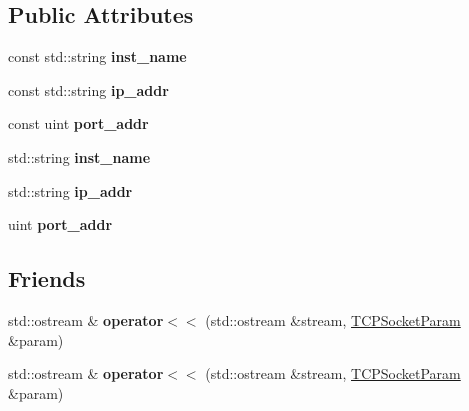 \subsection*{Public Attributes}
\begin{DoxyCompactItemize}
\item 
const std\+::string {\bfseries inst\+\_\+name}\hypertarget{struct_t_c_p_socket_param_adbcd0c094d7e3a8f8b083689ddccaff0}{}\label{struct_t_c_p_socket_param_adbcd0c094d7e3a8f8b083689ddccaff0}

\item 
const std\+::string {\bfseries ip\+\_\+addr}\hypertarget{struct_t_c_p_socket_param_a4dc4a074c147c36e0b281f7c25a96185}{}\label{struct_t_c_p_socket_param_a4dc4a074c147c36e0b281f7c25a96185}

\item 
const uint {\bfseries port\+\_\+addr}\hypertarget{struct_t_c_p_socket_param_a25103ad0fba22c679759538a8e2061b9}{}\label{struct_t_c_p_socket_param_a25103ad0fba22c679759538a8e2061b9}

\item 
std\+::string {\bfseries inst\+\_\+name}\hypertarget{struct_t_c_p_socket_param_ac6dd6cff76fe32d52214c39c8541201e}{}\label{struct_t_c_p_socket_param_ac6dd6cff76fe32d52214c39c8541201e}

\item 
std\+::string {\bfseries ip\+\_\+addr}\hypertarget{struct_t_c_p_socket_param_a4f424a058098e28b8a51c5d17b1fdc8a}{}\label{struct_t_c_p_socket_param_a4f424a058098e28b8a51c5d17b1fdc8a}

\item 
uint {\bfseries port\+\_\+addr}\hypertarget{struct_t_c_p_socket_param_a32da96a5f7f1aa3fe92db4454fba947c}{}\label{struct_t_c_p_socket_param_a32da96a5f7f1aa3fe92db4454fba947c}

\end{DoxyCompactItemize}
\subsection*{Friends}
\begin{DoxyCompactItemize}
\item 
std\+::ostream \& {\bfseries operator$<$$<$} (std\+::ostream \&stream, \hyperlink{struct_t_c_p_socket_param}{T\+C\+P\+Socket\+Param} \&param)\hypertarget{struct_t_c_p_socket_param_a2d9b78bcfdce6bdc7e301d7e819114c7}{}\label{struct_t_c_p_socket_param_a2d9b78bcfdce6bdc7e301d7e819114c7}

\item 
std\+::ostream \& {\bfseries operator$<$$<$} (std\+::ostream \&stream, \hyperlink{struct_t_c_p_socket_param}{T\+C\+P\+Socket\+Param} \&param)\hypertarget{struct_t_c_p_socket_param_a2d9b78bcfdce6bdc7e301d7e819114c7}{}\label{struct_t_c_p_socket_param_a2d9b78bcfdce6bdc7e301d7e819114c7}

\end{DoxyCompactItemize}


